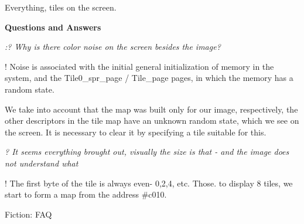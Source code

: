 \documentclass{article}
\begin{document}
Everything, tiles on the screen.

\textbf{Questions and Answers }

\emph{:? Why is there color noise on the screen besides the image? }

! Noise is associated with the initial general initialization of
memory in the system, and the Tile0\_spr\_page / Tile\_page pages, in
which the memory has a random state.

We take into account that the map was built only for our image,
respectively, the other descriptors in the tile map have an unknown
random state, which we see on the screen. It is necessary to clear it
by specifying a tile suitable for this.

\emph{? It seems everything brought out, visually the size is that -
  and the image does not understand what}

! The first byte of the tile is always even- 0,2,4, etc. Those. to
display 8 tiles, we start to form a map from the address \#c010.

Fiction: FAQ
\end{document}
